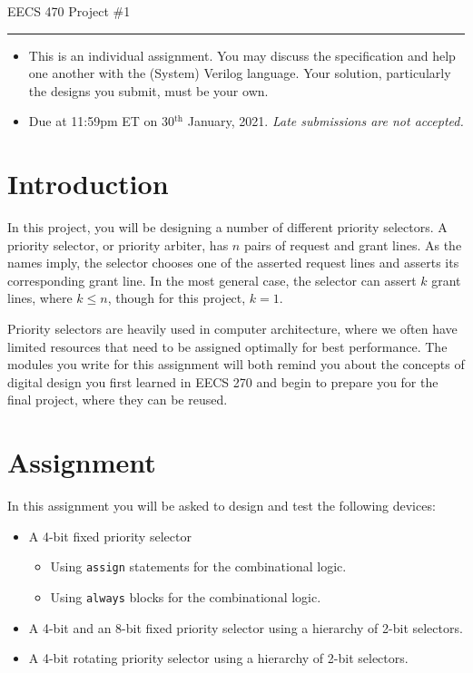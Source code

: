 \documentclass{article}
\newcommand{\shortbar}{
	\vspace*{-12pt}
	\begin{center}
		\rule{5ex}{0.1pt}
	\end{center}
}
\newcommand{\project}[1]{
	\begin{center}
		\LARGE{
			\vspace*{-12pt}
			EECS 470 Project \##1
			\shortbar
		}
	\end{center}
}
\begin{document}
\vspace*{-20pt}
\project{1}

\begin{itemize}
	\item This is an individual assignment. You may discuss the specification
		and help one another with the (System) Verilog language. Your solution,
		particularly the designs you submit, must be your own.
	\item Due at 11:59pm ET on 30$^{\text{th}}$ January, 2021. \emph{Late submissions are 
		not accepted.}
\end{itemize}
\hrulefill

\section{Introduction}
In this project, you will be designing a number of different priority selectors.
A priority selector, or priority arbiter, has $n$ pairs of request and grant
lines. As the names imply, the selector chooses one of the asserted request
lines and asserts its corresponding grant line. In the most general case, the
selector can assert $k$ grant lines, where $k \le n$, though for this project,
$k=1$. 

Priority selectors are heavily used in computer architecture, where we often
have limited resources that need to be assigned optimally for best performance.
The modules you write for this assignment will both remind you about the
concepts of digital design you first learned in EECS 270 and begin to prepare
you for the final project, where they can be reused. 

\section{Assignment}
In this assignment you will be asked to design and test the following devices:
\begin{itemize}
	\item A 4-bit fixed priority selector
		\begin{itemize}
			\item Using \texttt{assign} statements for the combinational logic.
			\item Using \texttt{always} blocks for the combinational logic.
		\end{itemize}
	\item A 4-bit and an 8-bit fixed priority selector using a hierarchy of
		2-bit selectors.
	\item A 4-bit rotating priority selector using a hierarchy of 2-bit
		selectors.
\end{itemize}
\end{document}
